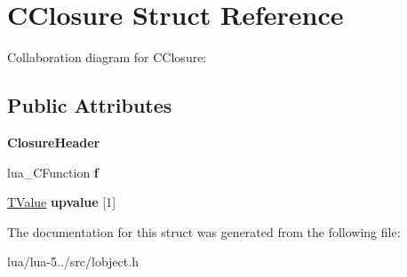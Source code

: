 \hypertarget{struct_c_closure}{\section{C\+Closure Struct Reference}
\label{struct_c_closure}
}


Collaboration diagram for C\+Closure\+:
\subsection*{Public Attributes}
\begin{DoxyCompactItemize}
\item 
\hypertarget{struct_c_closure_a552c31467816a1fafbd719cf83ff9cba}{{\bfseries Closure\+Header}}\label{struct_c_closure_a552c31467816a1fafbd719cf83ff9cba}

\item 
\hypertarget{struct_c_closure_a1ba64febc8e6adc43fdbb82583852000}{lua\+\_\+\+C\+Function {\bfseries f}}\label{struct_c_closure_a1ba64febc8e6adc43fdbb82583852000}

\item 
\hypertarget{struct_c_closure_a75d6bfc66f8ed48b3dd67007be84174f}{\hyperlink{structlua___t_value}{T\+Value} {\bfseries upvalue} \mbox{[}1\mbox{]}}\label{struct_c_closure_a75d6bfc66f8ed48b3dd67007be84174f}

\end{DoxyCompactItemize}


The documentation for this struct was generated from the following file\+:\begin{DoxyCompactItemize}
\item 
lua/lua-\/5../src/lobject.\+h\end{DoxyCompactItemize}

